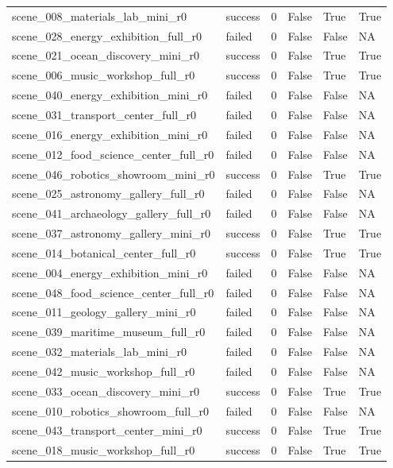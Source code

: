 \begin{tabular}{llllll}
scene\_008\_materials\_lab\_mini\_r0 & success & 0 & False & True & True \\
scene\_028\_energy\_exhibition\_full\_r0 & failed & 0 & False & False & NA \\
scene\_021\_ocean\_discovery\_mini\_r0 & success & 0 & False & True & True \\
scene\_006\_music\_workshop\_full\_r0 & success & 0 & False & True & True \\
scene\_040\_energy\_exhibition\_mini\_r0 & failed & 0 & False & False & NA \\
scene\_031\_transport\_center\_full\_r0 & failed & 0 & False & False & NA \\
scene\_016\_energy\_exhibition\_mini\_r0 & failed & 0 & False & False & NA \\
scene\_012\_food\_science\_center\_full\_r0 & failed & 0 & False & False & NA \\
scene\_046\_robotics\_showroom\_mini\_r0 & success & 0 & False & True & True \\
scene\_025\_astronomy\_gallery\_full\_r0 & failed & 0 & False & False & NA \\
scene\_041\_archaeology\_gallery\_full\_r0 & failed & 0 & False & False & NA \\
scene\_037\_astronomy\_gallery\_mini\_r0 & success & 0 & False & True & True \\
scene\_014\_botanical\_center\_full\_r0 & success & 0 & False & True & True \\
scene\_004\_energy\_exhibition\_mini\_r0 & failed & 0 & False & False & NA \\
scene\_048\_food\_science\_center\_full\_r0 & failed & 0 & False & False & NA \\
scene\_011\_geology\_gallery\_mini\_r0 & failed & 0 & False & False & NA \\
scene\_039\_maritime\_museum\_full\_r0 & failed & 0 & False & False & NA \\
scene\_032\_materials\_lab\_mini\_r0 & failed & 0 & False & False & NA \\
scene\_042\_music\_workshop\_full\_r0 & failed & 0 & False & False & NA \\
scene\_033\_ocean\_discovery\_mini\_r0 & success & 0 & False & True & True \\
scene\_010\_robotics\_showroom\_full\_r0 & failed & 0 & False & False & NA \\
scene\_043\_transport\_center\_mini\_r0 & success & 0 & False & True & True \\
scene\_018\_music\_workshop\_full\_r0 & success & 0 & False & True & True \\

\end{tabular}
